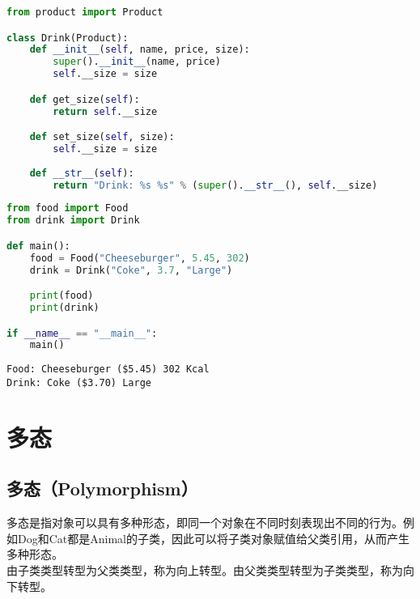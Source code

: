 \begin{lstlisting}[language=Python]
from product import Product

class Drink(Product):
    def __init__(self, name, price, size):
        super().__init__(name, price)
        self.__size = size

    def get_size(self):
        return self.__size

    def set_size(self, size):
        self.__size = size
    
    def __str__(self):
        return "Drink: %s %s" % (super().__str__(), self.__size)
\end{lstlisting}

\begin{lstlisting}[language=Python]
from food import Food
from drink import Drink

def main():
    food = Food("Cheeseburger", 5.45, 302)
    drink = Drink("Coke", 3.7, "Large")

    print(food)
    print(drink)

if __name__ == "__main__":
    main()
\end{lstlisting}

\begin{tcolorbox}
    \begin{verbatim}
Food: Cheeseburger ($5.45) 302 Kcal
Drink: Coke ($3.70) Large
	\end{verbatim}
\end{tcolorbox}

\newpage

\section{多态}

\subsection{多态（Polymorphism）}

多态是指对象可以具有多种形态，即同一个对象在不同时刻表现出不同的行为。例如Dog和Cat都是Animal的子类，因此可以将子类对象赋值给父类引用，从而产生多种形态。\\

由子类类型转型为父类类型，称为向上转型。由父类类型转型为子类类型，称为向下转型。\\


